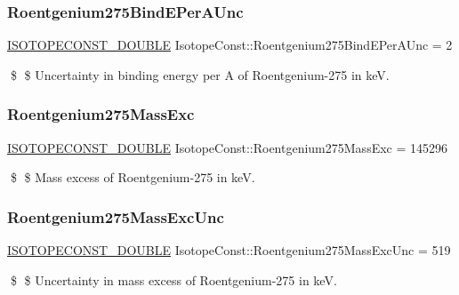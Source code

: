 \subsubsection{\texorpdfstring{Roentgenium275\+Bind\+E\+Per\+A\+Unc}{Roentgenium275BindEPerAUnc}}
{\footnotesize\ttfamily \mbox{\hyperlink{group___isotope_const-_macros_ga8f45a7272ce02c0b4c65c44636ed719a}{I\+S\+O\+T\+O\+P\+E\+C\+O\+N\+S\+T\+\_\+\+D\+O\+U\+B\+LE}} Isotope\+Const\+::\+Roentgenium275\+Bind\+E\+Per\+A\+Unc = 2}

\$ \$ Uncertainty in binding energy per A of Roentgenium-\/275 in keV. \mbox{\label{group___isotope_const-_roentgenium-_rg275_ga7dd1412c616f7862a40640083d4a452f}} 
\subsubsection{\texorpdfstring{Roentgenium275\+Mass\+Exc}{Roentgenium275MassExc}}
{\footnotesize\ttfamily \mbox{\hyperlink{group___isotope_const-_macros_ga8f45a7272ce02c0b4c65c44636ed719a}{I\+S\+O\+T\+O\+P\+E\+C\+O\+N\+S\+T\+\_\+\+D\+O\+U\+B\+LE}} Isotope\+Const\+::\+Roentgenium275\+Mass\+Exc = 145296}

\$ \$ Mass excess of Roentgenium-\/275 in keV. \mbox{\label{group___isotope_const-_roentgenium-_rg275_ga22ea93db7cab0ff5e52eb8c56f903c91}} 
\subsubsection{\texorpdfstring{Roentgenium275\+Mass\+Exc\+Unc}{Roentgenium275MassExcUnc}}
{\footnotesize\ttfamily \mbox{\hyperlink{group___isotope_const-_macros_ga8f45a7272ce02c0b4c65c44636ed719a}{I\+S\+O\+T\+O\+P\+E\+C\+O\+N\+S\+T\+\_\+\+D\+O\+U\+B\+LE}} Isotope\+Const\+::\+Roentgenium275\+Mass\+Exc\+Unc = 519}

\$ \$ Uncertainty in mass excess of Roentgenium-\/275 in keV. \mbox{\label{group___isotope_const-_roentgenium-_rg275_ga46091bb8103e5b14060002608d0a119f}} 
